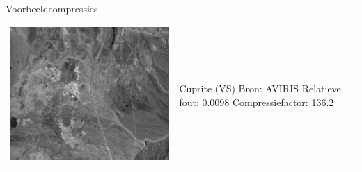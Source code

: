 \documentclass[t,12pt,dutch
\ifx\beamermode\undefined\else,\beamermode\fi
]{beamer}
\begin{document}
\begin{frame}{Voorbeeldcompressies}

\begin{table}[H]
\centering
\begin{tabular}{C{0.6\textwidth}  L{0.4\textwidth}}
\includegraphics[width=\linewidth]{images/example_compression_Cuprite_0_01.png}
&
Cuprite (VS)\newline
Bron: AVIRIS \cite{ref:ehu_aviris_cuprite}\newline
\vspace{5mm}
Relatieve fout: 0.0098
Compressiefactor: 136.2
\end{tabular}
\end{table}

\end{frame}
\end{document}

